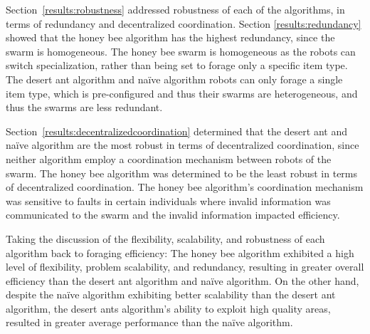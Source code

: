 Section~\ref{results:robustness} addressed robustness of each of the algorithms, in terms of redundancy and decentralized coordination. Section \ref{results:redundancy} showed that the honey bee algorithm has the highest redundancy, since the swarm is homogeneous. The honey bee swarm is homogeneous as the robots can switch specialization, rather than being set to forage only a specific item type. The desert ant algorithm and na\"ive algorithm robots can only forage a single item type, which is pre-configured and thus their swarms are heterogeneous, and thus the swarms are less redundant.

Section~\ref{results:decentralizedcoordination} determined that the desert ant and na\"ive algorithm are the most robust in terms of decentralized coordination, since neither algorithm employ a coordination mechanism between robots of the swarm. The honey bee algorithm was determined to be the least robust in terms of decentralized coordination. The honey bee algorithm's coordination mechanism was sensitive to faults in certain individuals where invalid information was communicated to the swarm and the invalid information impacted efficiency.

Taking the discussion of the flexibility, scalability, and robustness of each algorithm back to foraging efficiency: The honey bee algorithm exhibited a high level of flexibility, problem scalability, and redundancy, resulting in greater overall efficiency than the desert ant algorithm and na\"ive algorithm. On the other hand, despite the na\"ive algorithm exhibiting better scalability than the desert ant algorithm, the desert ants algorithm's ability to exploit high quality areas, resulted in greater average performance than the na\"ive algorithm.

